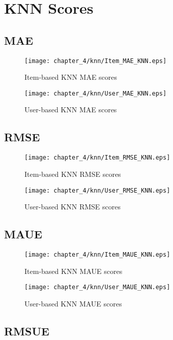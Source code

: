 
\section{KNN Scores}

\subsection{MAE}

\begin{figure}[H]
\centering
\texttt{[image: chapter\_4/knn/Item\_MAE\_KNN.eps]}
\caption{Item-based KNN MAE scores}
\end{figure}

\begin{figure}[H]
\centering
\texttt{[image: chapter\_4/knn/User\_MAE\_KNN.eps]}
\caption{User-based KNN MAE scores}
\end{figure}

\subsection{RMSE}

\begin{figure}[H]
\centering
\texttt{[image: chapter\_4/knn/Item\_RMSE\_KNN.eps]}
\caption{Item-based KNN RMSE scores}
\end{figure}

\begin{figure}[H]
\centering
\texttt{[image: chapter\_4/knn/User\_RMSE\_KNN.eps]}
\caption{User-based KNN RMSE scores}
\end{figure}

\subsection{MAUE}

\begin{figure}[H]
\centering
\texttt{[image: chapter\_4/knn/Item\_MAUE\_KNN.eps]}
\caption{Item-based KNN MAUE scores}
\end{figure}

\begin{figure}[H]
\centering
\texttt{[image: chapter\_4/knn/User\_MAUE\_KNN.eps]}
\caption{User-based KNN MAUE scores}
\end{figure}

\subsection{RMSUE}

